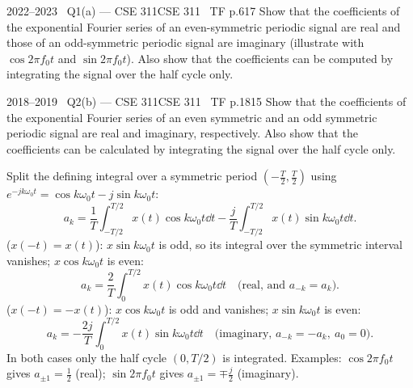\begin{qcard}{2022--2023 \textbullet\ Q1(a) --- CSE 311}{CSE 311 \textbullet\ TF p.6}{17}
Show that the coefficients of the exponential Fourier series of an even-symmetric periodic signal are real and those of an odd-symmetric periodic signal are imaginary (illustrate with $\cos2\pi f_0t$ and $\sin2\pi f_0t$). Also show that the coefficients can be computed by integrating the signal over the half cycle only.
\end{qcard}
\begin{qcard}{2018--2019 \textbullet\ Q2(b) --- CSE 311}{CSE 311 \textbullet\ TF p.18}{15}
Show that the coefficients of the exponential Fourier series of an even symmetric and an odd symmetric periodic signal are real and imaginary, respectively. Also show that the coefficients can be calculated by integrating the signal over the half cycle only.
\end{qcard}
\begin{solution}
Split the defining integral over a symmetric period $(-\frac T2,\frac T2)$ using $e^{-jk\omega_0t}=\cos k\omega_0t-j\sin k\omega_0t$:
\[a_k=\frac1T\int_{-T/2}^{T/2}x(t)\cos k\omega_0t\dd t-\frac jT\int_{-T/2}^{T/2}x(t)\sin k\omega_0t\dd t .\]
 ($x(-t)=x(t)$): $x\sin k\omega_0t$ is odd, so its integral over the symmetric interval vanishes; $x\cos k\omega_0t$ is even:
\[a_k=\frac2T\int_0^{T/2}x(t)\cos k\omega_0t\dd t\quad\text{(real, and }a_{-k}=a_k).\]
 ($x(-t)=-x(t)$): $x\cos k\omega_0t$ is odd and vanishes; $x\sin k\omega_0t$ is even:
\[a_k=-\frac{2j}T\int_0^{T/2}x(t)\sin k\omega_0t\dd t\quad\text{(imaginary, }a_{-k}=-a_k,\ a_0=0).\]
In both cases only the half cycle $(0,T/2)$ is integrated. Examples: $\cos2\pi f_0t$ gives $a_{\pm1}=\frac12$ (real); $\sin2\pi f_0t$ gives $a_{\pm1}=\mp\frac j2$ (imaginary).
\end{solution}
